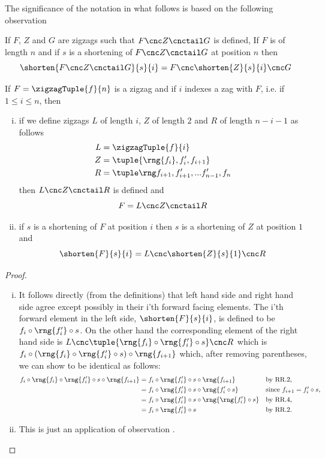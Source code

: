 The significance of the notation in what follows is based
on the following observation
\begin{observation}

If $F$, $Z$ and $G$ are zigzags such that 
$F \cnc Z \cnctail G$ is defined, If $F$ is of length $n$
and if $s$ is a shortening of $F \cnc Z \cnctail G$ at
position $n$ then 
\[
\shorten{F \cnc Z \cnctail G}{s}{i} 
   = F \cnc \shorten{Z}{s}{i} \cnc G
\]
\end{observation}

\begin{lemma}
If $F= \zigzagTuple{f}{n}$ is a zigzag and if $i$ indexes a zag
with $F$, i.e. if $1 \leq i \leq n$, then
 
\begin{enumerate}[(i)]
\item if we define zigzags $L$ of length $i$, $Z$ of length $2$ and $R$ of length $n-i-1$ as follows
\begin{align*}
L &= \zigzagTuple{f}{i} \\
Z &= \tuple {\rng{f_i}, f'_i, f_{i+1}} \\
R &= \zigzagIsolationTailTuple{f}{i}{n}
\end{align*}
then $L \cnc Z \cnctail R$ is defined and
\[
F = L \cnc Z \cnctail R
\]
\item if $s$ is a shortening of $F$ at position $i$
then $s$ is a shortening of $Z$ at position $1$ 
and
\[
\shorten{F}{s}{i} = L \cnc \shorten{Z}{s}{1} \cnc R
\]
\end{enumerate}
\end{lemma}
\begin{proof}
\begin{enumerate}[(i)]
\item
It follows directly (from the definitions) that left hand side and right hand side agree except possibly in 
their i'th forward facing elements.
The i'th forward element in the left side, $\shorten{F}{s}{i}$,
is defined to be 
$f_i \circ \rng{f'_i} \circ s$. 
On the other hand the 
corresponding element of the right hand side is
$L \cnc \tuple{\rng{f_i} \circ \rng{f'_i} \circ s} \cnc R$ which
is $f_i \circ (\rng{f_i} \circ \rng{f'_i} \circ s) \circ \rng{f_{i+1}}$
which, after removing parentheses, we can  show to be identical as follows:
\begin{align*}
f_i \circ \rng{f_i} \circ \rng{f'_i} \circ s \circ \rng{f_{i+1}}
&= f_i  \circ \rng{f'_i} \circ s \circ \rng{f_{i+1}} &&\mbox{by RR.2,}\\
&= f_i \circ \rng{f'_i} \circ s \circ \rng{f'_i \circ s} 
           &&\mbox{since $f_{i+1} = f'_i \circ s$,}           \\
&= f_i \circ \rng{f'_i} \circ s \circ \rng{\rng{f'_i} \circ s} 
           &&\mbox{by RR.4,}                                  \\
&= f_i \circ \rng{f'_i} \circ s
           && \mbox{by RR.2.}
\end{align*}
\item %
This is just an application of observation .
\end{enumerate}
\end{proof}

